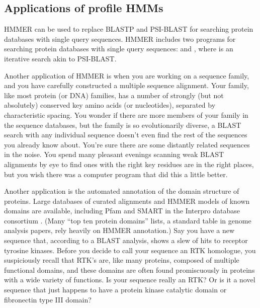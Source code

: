 \subsection{Applications of profile HMMs}

HMMER can be used to replace BLASTP and PSI-BLAST for searching protein
databases with single query sequences. HMMER includes two
programs for searching protein databases with single query sequences:
 and , where  is an
iterative search akin to PSI-BLAST.

Another application of HMMER is when you are working on a 
sequence family, and you have carefully constructed a multiple
sequence alignment. Your family, like most protein (or DNA) families, has 
a number of strongly (but not absolutely) conserved key amino acids
(or nucleotides), separated by characteristic spacing. You wonder if there 
are more members of your family in the sequence databases, but the family is 
so evolutionarily diverse, a BLAST search with any individual sequence
doesn't even find the rest of the sequences you already know
about. You're sure there are some distantly related sequences in the
noise. You spend many pleasant evenings scanning weak BLAST alignments
by eye to find ones with the right key residues are in the right
places, but you wish there was a computer program that did this a
little better.

Another application is the automated annotation of the domain
structure of proteins. Large databases of curated alignments and HMMER
models of known domains are available, including Pfam \citep{Finn10}
and SMART \citep{Letunic06} in the Interpro database consortium
\citep{Mulder03}. (Many ``top ten protein domains'' lists, a standard
table in genome analysis papers, rely heavily on HMMER annotation.)
Say you have a new sequence that, according to a BLAST analysis, shows
a slew of hits to receptor tyrosine kinases. Before you decide to call
your sequence an RTK homologue, you suspiciously recall that RTK's
are, like many proteins, composed of multiple functional domains, and
these domains are often found promiscuously in proteins with a wide
variety of functions. Is your sequence really an RTK? Or is it a novel
sequence that just happens to have a protein kinase catalytic domain
or fibronectin type III domain?

